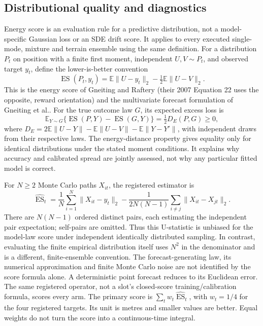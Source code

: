 \documentclass[11pt]{article}
\newcommand{\ES}{\operatorname{ES}}
\begin{document}
\label{sec:inference}
\subsection{Distributional quality and diagnostics}
Energy score is an evaluation rule for a predictive distribution, not a
model-specific Gaussian loss or an SDE drift score. It applies to every
executed single-mode, mixture and terrain ensemble using the same definition.
For a distribution \(P_t\) on position with a finite first moment,
independent \(U,V\sim P_t\), and observed target \(y_t\), define the
lower-is-better convention
\begin{equation}
 \ES(P_t,y_t)=\mathbb E\|U-y_t\|_2-\tfrac12\mathbb E\|U-V\|_2 .
 \label{eq:population-es}
\end{equation}
This is the energy score of Gneiting and Raftery (their 2007
Equation 22 uses the opposite, reward orientation) and the multivariate
forecast formulation of Gneiting et al.\cite{gneiting2007,gneiting2008}.
For the true outcome law \(G\), its expected excess loss is
\begin{equation}
 \mathbb E_{Y\sim G}\{\ES(P,Y)-\ES(G,Y)\}
 =\tfrac12 D_E(P,G)\geq0 ,
 \label{eq:es-propriety}
\end{equation}
where \(D_E=2\mathbb E\|U-Y\|-\mathbb E\|U-V\|-\mathbb E\|Y-Y'\|\),
with independent draws from their respective laws. The energy-distance
property gives equality only for identical distributions under the stated
moment conditions. It explains why accuracy and calibrated spread are
jointly assessed, not why any particular fitted model is correct.

For \(N\geq2\) Monte Carlo paths \(X_{it}\), the registered estimator is
\begin{equation}
 \widehat{\ES}_t=\frac1N\sum_{i=1}^N\|X_{it}-y_t\|_2
  -\frac{1}{2N(N-1)}\sum_{i\ne j}\|X_{it}-X_{jt}\|_2.
 \label{eq:ensemble-es}
\end{equation}
There are \(N(N-1)\) ordered distinct pairs, each estimating the independent
pair expectation; self-pairs are omitted. Thus this U-statistic is unbiased
for the model-law score under independent identically distributed sampling.
In contrast, evaluating the finite empirical distribution itself uses
\(N^2\) in the denominator and is a different, finite-ensemble convention.
The forecast-generating law, its numerical approximation and finite Monte
Carlo noise are not identified by the score formula alone. A deterministic
point forecast reduces to its Euclidean error. The same registered operator,
not a slot's closed-score training/calibration formula, scores every arm.
The primary score is \(\sum_t w_t\widehat{\ES}_t\), with \(w_t=1/4\) for
the four registered targets. Its unit is metres and smaller values are better.
Equal weights do not turn the score into a continuous-time integral.
\end{document}

